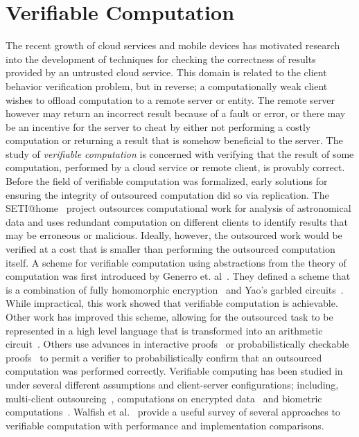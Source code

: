 \section{Verifiable Computation}
The recent growth of cloud services and mobile devices has motivated
research into the development of techniques for checking the
correctness of results provided by an untrusted cloud service. This
domain is related to the client behavior verification problem, but in
reverse; a computationally weak client wishes to offload computation
to a remote server or entity. The remote server however may return an
incorrect result because of a fault or error, or there may be an
incentive for the server to cheat by either not performing a costly
computation or returning a result that is somehow beneficial to the
server. The study of \emph{verifiable computation} is concerned with
verifying that the result of some computation, performed by a cloud
service or remote client, is provably correct.  Before the field of
verifiable
computation was formalized, early solutions for ensuring the integrity
of outsourced computation did so via replication. The
SETI@home~\cite{anderson02:seti} project outsources computational work
for analysis of astronomical data and uses redundant computation on
different clients to identify results that may be erroneous or
malicious. Ideally, however, the outsourced work would be verified at
a cost  that is smaller than performing the outsourced computation
itself. A scheme for verifiable computation using abstractions from
the theory of computation was first introduced by Generro et.
al~\cite{gennaro10:non}. They defined a scheme that is a combination
of fully homomorphic encryption~\cite{gentry09:fully} and Yao's
garbled circuits~\cite{yao86:generate}. While impractical, this work
showed that verifiable computation is achievable. Other work has
improved this scheme, allowing for the outsourced task to be
represented in a high level language that is transformed into an
arithmetic circuit~\cite{parno13:pinocchio,vu13:hybrid,ben13:snarks}.
Others use advances in interactive proofs~\cite{goldwasser08:muggles}
or probabilistically checkable proofs~\cite{ishai07:efficient} to
permit a verifier to probabilistically confirm that an outsourced
computation was performed correctly. Verifiable computing has been
studied in under several different assumptions and client-server
configurations; including, multi-client
outsourcing~\cite{choi13:multi}, computations on encrypted
data~\cite{fiore14:encrypted} and biometric
computations~\cite{blanton13:biometric}. Walfish et
al.~\cite{walfish15:verifying} provide a useful survey of several
approaches to verifiable computation with performance and
implementation comparisons.

